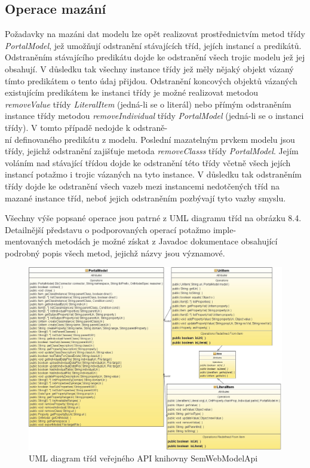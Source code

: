 \documentclass{projekt}
\begin{document}
\subsection{Operace mazání}
\hspace{0.65cm}Požadavky na mazáni dat modelu lze opět realizovat prostřednictvím metod třídy {\it PortalModel}, jež umožňují odstranění stávajících tříd, jejích instancí a predikátů. Odstraněním stávajícího predikátu dojde ke odstranění všech trojic modelu jež jej obsahují. V důsledku tak všechny instance třídy jež měly nějaký objekt vázaný tímto predikátem o tento údaj přijdou. Odstranění koncových objektů vázaných existujícím predikátem ke instanci třídy je možné realizovat metodou {\it removeValue} třídy {\it LiteralItem} (jedná-li se o literál) nebo přímým odstraněním instance třídy metodou {\it removeIndividual} třídy {\it PortalModel} (jedná-li se o instanci třídy). V tomto případě nedojde k odstraně-\\ní definovaného predikátu z modelu. Poslední mazatelným prvkem modelu jsou třídy, jejichž odstranění zajišťuje metoda {\it removeClasss} třídy {\it PortalModel}. Jejím voláním nad stávající třídou dojde ke odstranění této třídy včetně všech jejích instancí potažmo i trojic vázaných na tyto instance. V důsledku tak odstraněním třídy dojde ke odstranění všech vazeb mezi instancemi nedotčených tříd na mazané instance tříd, neboť jejich odstraněním pozbývají tyto vazby smyslu.

Všechny výše popsané operace jsou patrné z UML diagramu tříd na obrázku 8.4. Detailnější představu o podporovaných operací potažmo imple-\\mentovaných metodách je možné získat z Javadoc dokumentace obsahující podrobný popis všech metod, jejichž názvy jsou významové.


\begin{figure}[htb]
\begin{center}
\includegraphics[scale=0.37]{api.jpg}
\caption{UML diagram tříd veřejného API knihovny SemWebModelApi}
\end{center}
\end{figure}
\end{document}
